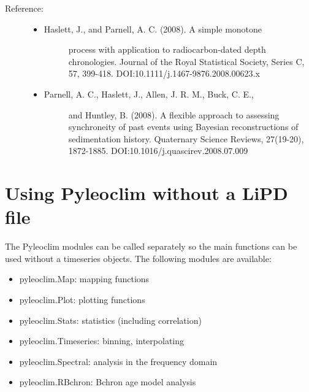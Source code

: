 \documentclass[letterpaper,10pt,english]{sphinxmanual}
\begin{document}
\begin{fulllineitems}
\begin{description}
\item[{Reference:}] \leavevmode\begin{itemize}
\item {} \begin{description}
\item[{Haslett, J., and Parnell, A. C. (2008). A simple monotone}] \leavevmode
process with application to radiocarbon-dated depth
chronologies. Journal of the Royal Statistical Society,
Series C, 57, 399-418. DOI:10.1111/j.1467-9876.2008.00623.x

\end{description}

\item {} \begin{description}
\item[{Parnell, A. C., Haslett, J., Allen, J. R. M., Buck, C. E.,}] \leavevmode
and Huntley, B. (2008). A flexible approach to assessing
synchroneity of past events using Bayesian reconstructions
of sedimentation history. Quaternary Science Reviews,
27(19-20), 1872-1885. DOI:10.1016/j.quascirev.2008.07.009

\end{description}

\end{itemize}

\end{description}

\end{fulllineitems}



\section{Using Pyleoclim without a LiPD file}
\label{\detokenize{Main:using-pyleoclim-without-a-lipd-file}}
The Pyleoclim modules can be called separately so the main functions can be used without a timeseries objects.
The following modules are available:
\begin{itemize}
\item {} 
pyleoclim.Map: mapping functions

\item {} 
pyleoclim.Plot: plotting functions

\item {} 
pyleoclim.Stats: statistics (including correlation)

\item {} 
pyleoclim.Timeseries: binning, interpolating

\item {} 
pyleoclim.Spectral: analysis in the frequency domain

\item {} 
pyleoclim.RBchron: Bchron age model analysis

\end{itemize}
\end{document}
